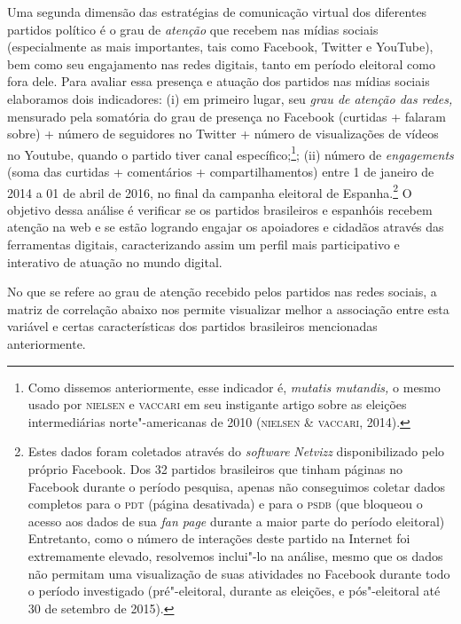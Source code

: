 Uma segunda dimensão das estratégias de comunicação virtual dos
diferentes partidos político é o grau de \emph{atenção} que recebem nas
mídias sociais (especialmente as mais importantes, tais como Facebook,
Twitter e YouTube), bem como seu engajamento nas redes digitais, tanto
em período eleitoral como fora dele. Para avaliar essa presença e
atuação dos partidos nas mídias sociais elaboramos dois indicadores: (i)
em primeiro lugar, seu \emph{grau de atenção das redes,} mensurado pela
somatória do grau de presença no Facebook (curtidas + falaram sobre) +
número de seguidores no Twitter + número de visualizações de vídeos no
Youtube, quando o partido tiver canal específico;\footnote{Como dissemos
  anteriormente, esse indicador é, \emph{mutatis mutandis,} o mesmo
  usado por \textsc{nielsen} e \textsc{vaccari} em seu instigante artigo sobre as eleições
  intermediárias norte"-americanas de 2010 (\textsc{nielsen \& vaccari}, 2014).};
(ii) número de \emph{engagements} (soma das curtidas + comentários +
compartilhamentos) entre 1 de janeiro de 2014 a 01 de abril de 2016, no
final da campanha eleitoral de Espanha.\footnote{Estes dados foram
  coletados através do \emph{\emph{software}} \emph{Netvizz} disponibilizado pelo
  próprio Facebook. Dos 32 partidos brasileiros que tinham páginas no
  Facebook durante o período pesquisa, apenas não conseguimos coletar
  dados completos para o \textsc{pdt} (página desativada) e para o \textsc{psdb} (que
  bloqueou o acesso aos dados de sua \emph{fan page} durante a maior
  parte do período eleitoral) Entretanto, como o número de interações
  deste partido na Internet foi extremamente elevado, resolvemos
  inclui"-lo na análise, mesmo que os dados não permitam uma visualização
  de suas atividades no Facebook durante todo o período investigado
  (pré"-eleitoral, durante as eleições, e pós"-eleitoral até 30 de
  setembro de 2015).} O objetivo dessa análise é verificar se os
partidos brasileiros e espanhóis recebem atenção na web e se estão
logrando engajar os apoiadores e cidadãos através das ferramentas
digitais, caracterizando assim um perfil mais participativo e interativo
de atuação no mundo digital.

No que se refere ao grau de atenção recebido pelos partidos nas redes
sociais, a matriz de correlação abaixo nos permite visualizar melhor a
associação entre esta variável e certas características dos partidos
brasileiros mencionadas anteriormente.

\pagebreak

